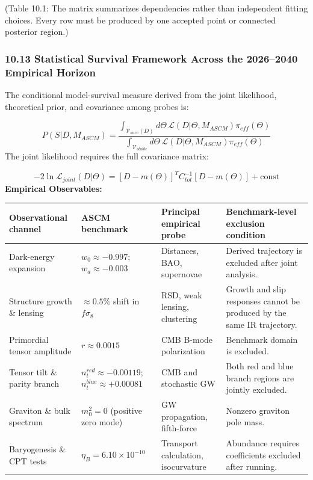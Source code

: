 \documentclass[aps,prd,onecolumn,superscriptaddress,nofootinbib,longbibliography,10pt]{revtex4-2}
\begin{document}
  (Table 10.1: The matrix summarizes dependencies rather than independent fitting choices. Every row must be produced by one accepted point or connected posterior region.)



  
\subsubsection*{10.13 Statistical Survival Framework Across the 2026–2040 Empirical Horizon}

  The conditional model-survival measure derived from the joint likelihood, theoretical prior, and covariance among probes is:


  \[ P(S|D, M_{ASCM}) = \frac{\int_{\mathcal{V}_{surv}(D)} d\Theta\,\mathcal{L}(D|\Theta, M_{ASCM})\pi_{eff}(\Theta)}{\int_{\mathcal{V}_{stable}} d\Theta\,\mathcal{L}(D|\Theta, M_{ASCM})\pi_{eff}(\Theta)} \]
  The joint likelihood requires the full covariance matrix:


  \[ -2\ln\mathcal{L}_{joint}(D|\Theta) = [D - m(\Theta)]^T C_{tot}^{-1} [D - m(\Theta)] + \text{const} \]
  \textbf{Empirical Observables:}


  
\begin{center}
\begin{tabular}{|llll|}
\hline

      Observational channel & ASCM benchmark & Principal empirical probe & Benchmark-level exclusion condition
       \\ \hline

    
    
      Dark-energy expansion & \(w_0 \approx -0.997\); \(w_a \approx -0.003\) & Distances, BAO, supernovae & Derived trajectory is excluded after joint analysis. \\ \hline

      Structure growth \& lensing & \(\approx 0.5\%\) shift in \(f\sigma_8\) & RSD, weak lensing, clustering & Growth and slip responses cannot be produced by the same IR trajectory. \\ \hline

      Primordial tensor amplitude & \(r \approx 0.0015\) & CMB B-mode polarization & Benchmark domain is excluded. \\ \hline

      Tensor tilt \& parity branch & \(n_t^{red} \approx -0.00119\); \(n_t^{blue} \approx +0.00081\) & CMB and stochastic GW & Both red and blue branch regions are jointly excluded. \\ \hline

      Graviton \& bulk spectrum & \(m_0^2 = 0\) (positive zero mode) & GW propagation, fifth-force & Nonzero graviton pole mass. \\ \hline

      Baryogenesis \& CPT tests & \(\eta_B = 6.10 \times 10^{-10}\) & Transport calculation, isocurvature & Abundance requires coefficients excluded after running. \\ \hline

    
  \end{tabular}
\end{center}
\end{document}
